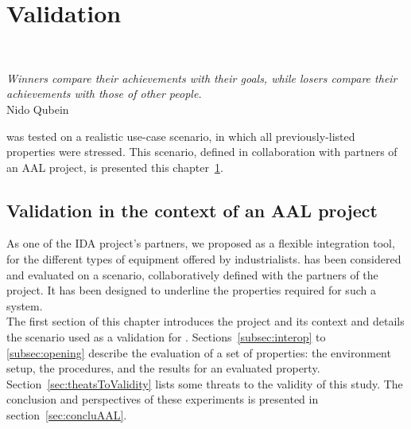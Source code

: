 \part{Validation}

~\vspace{1cm}
\begin{flushright}
{\it Winners compare their achievements with their goals, while losers compare their achievements with those of other people.}\\
Nido Qubein
\end{flushright}
\vspace{2cm}

\enti{} was tested on a realistic use-case scenario, in which all previously-listed properties were stressed. This scenario, defined in collaboration with partners of an AAL project, is presented this chapter~\ref{ch:aalValidation}.\\



\chapter{Validation in the context of an AAL project}
\label{ch:aalValidation}

As one of the IDA project's partners, we proposed \enti{} as a flexible integration tool, for the different types of equipment offered by industrialists. \enti{} has been considered and evaluated on a scenario, collaboratively defined with the partners of the project. It has been designed to underline the properties required for such a system.\\

The first section of this chapter introduces the project and its context and details the scenario used as a validation for \enti{}. Sections~\ref{subsec:interop} to \ref{subsec:opening} describe the evaluation of a set of properties: the environment setup, the procedures, and the results for an evaluated property. Section~\ref{sec:theatsToValidity} lists some threats to the validity of this study. The conclusion and perspectives of these experiments is presented in section~\ref{sec:concluAAL}.

